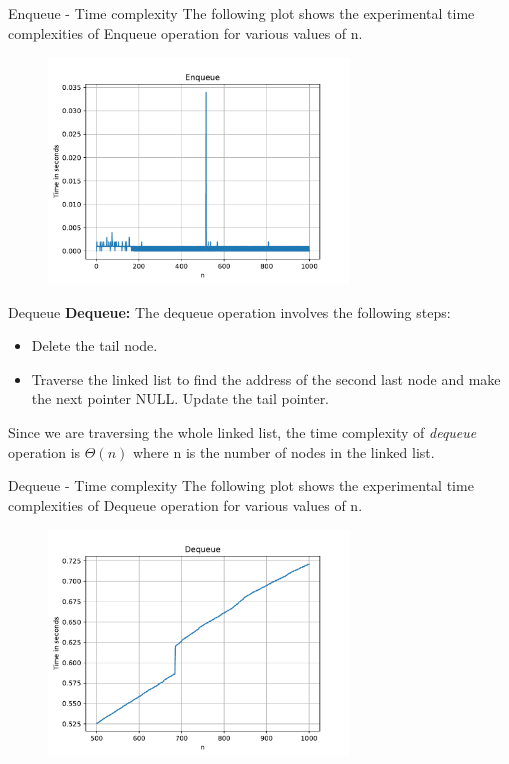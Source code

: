 \documentclass{beamer}
\begin{document}
\begin{frame}{Enqueue - Time complexity}
The following plot shows the experimental time complexities of Enqueue operation for various values of n.
\begin{figure}[!ht]
    \begin{center}
    \includegraphics[width=80mm,scale=0.8]{./figs/enqueue}
    \end{center}
    \label{fig1}	
\end{figure}
    
\end{frame}


\begin{frame}{Dequeue}
\textbf{Dequeue: } The dequeue operation involves the following steps:
\begin{itemize}
    \item Delete the tail node.
    \item Traverse the linked list to find the address of the second last node and make the next pointer NULL. Update the tail pointer.
\end{itemize}

Since we are traversing the whole linked list, the time 
complexity of \emph{dequeue} operation is $\Theta (n)$ where n is the number of nodes in the linked list.
    
\end{frame}


\begin{frame}{Dequeue - Time complexity}
The following plot shows the experimental time complexities of Dequeue operation for various values of n.
\begin{figure}[!ht]
    \begin{center}
    \includegraphics[width=80mm,scale=0.8]{./figs/dequeue}
    \end{center}
    \label{fig2}	
\end{figure}
    
\end{frame}
\end{document}
